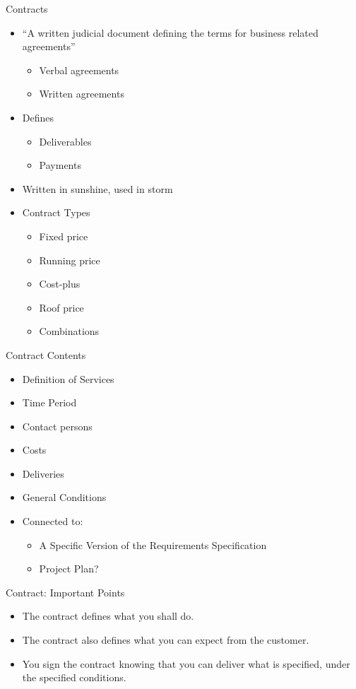 \documentclass[10pt,t,a4paper]{beamer}
\begin{document}
\begin{frame}[label=sec-1-15]{Contracts}
\begin{itemize}
\item “A written judicial document defining the terms for business related agreements”
\begin{itemize}
\item Verbal agreements
\item Written agreements
\end{itemize}

\item Defines
\begin{itemize}
\item Deliverables
\item Payments
\end{itemize}

\item Written in sunshine, used in storm

\item Contract Types
\begin{itemize}
\item Fixed price
\item Running price
\item Cost-plus
\item Roof price
\item Combinations
\end{itemize}
\end{itemize}
\end{frame}
\begin{frame}[label=sec-1-16]{Contract Contents}
\begin{itemize}
\item Definition of Services
\item Time Period
\item Contact persons
\item Costs
\item Deliveries
\item General Conditions

\item Connected to:
\begin{itemize}
\item A Specific Version of the Requirements Specification
\item Project Plan?
\end{itemize}
\end{itemize}
\end{frame}
\begin{frame}[label=sec-1-17]{Contract: Important Points}
\begin{itemize}
\item The contract defines what you shall do.
\item The contract also defines what you can expect from the customer.
\item You sign the contract knowing that you can deliver what is specified, under the specified conditions.
\end{itemize}
\end{frame}
\end{document}
